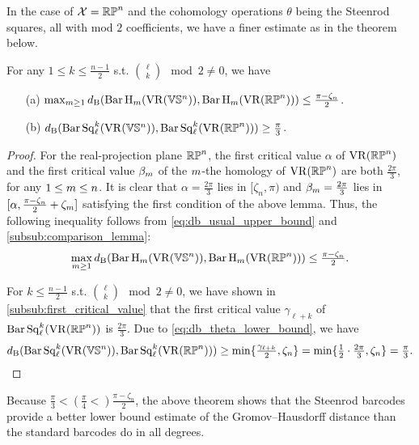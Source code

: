 In the case of $\mathcal{X} = \mathbb{RP}^n$ and the cohomology operations $\theta$ being the Steenrod squares, all with mod $2$ coefficients, we have a finer estimate as in the theorem below.

\medskip\theorem
For any $1\leq k \leq \frac{n-1}{2}$ s.t. $\binom{\ell}{k} \mod 2\neq 0$, we have
\begin{itemize} 
	\item[(a)] $\max_{m\geq 1}d_{\mathrm{B}}(\operatorname{Bar} \operatorname{H}_{m}(\operatorname{VR}(\mathbb{V}\mathbb{S}^n)), \operatorname{Bar} \operatorname{H}_{m}(\operatorname{VR}(\mathbb{RP}^n)))\leq \tfrac{\pi - \zeta_n}{2}$.
	\smallskip\item[(b)] $d_{\mathrm{B}}(\operatorname{Bar}\operatorname{Sq}^{k}_{\ell}(\operatorname{VR}(\mathbb{V}\mathbb{S}^n)), \operatorname{Bar}\operatorname{Sq}^{k}_{\ell}(\operatorname{VR}(\mathbb{RP}^n)))\geq \tfrac{\pi}{3}$.
\end{itemize}

\begin{proof}
        For the real-projection plane $\mathbb{RP}^n$, the first critical value $\alpha$ of $\operatorname{VR}(\mathbb{RP}^n)$ and the first critical value $\beta_m$ of the $m$-the homology of $\operatorname{VR}(\mathbb{RP}^n)$ are both $\tfrac{2\pi}{3}$, for any $1 \leq m \leq n$. %
        It is clear that $\alpha= \tfrac{2\pi}{3}$ lies in $[\zeta_n, \pi)$ and $\beta_m = \tfrac{2\pi}{3}$ lies in $[\alpha, \tfrac{\pi - \zeta_n}{2}+\zeta_m]$ satisfying the first condition of the above lemma. 
        Thus, the following inequality follows from \cref{eq:db_usual_upper_bound} and \cref{subsub:comparison_lemma}:
        \[\max_{m\geq 1}d_{\mathrm{B}}(\operatorname{Bar} \operatorname{H}_{m}(\operatorname{VR}(\mathbb{V}\mathbb{S}^n)), \operatorname{Bar} \operatorname{H}_{m}(\operatorname{VR}(\mathbb{RP}^n)))\leq \tfrac{\pi - \zeta_n}{2}.\]

        For $k \leq \frac{n-1}{2}$ s.t. $\binom{\ell}{k} \mod 2\neq 0$, we have shown in \cref{subsub:first_critical_value} that the first critical value $\gamma_{\ell+k}$ of $\operatorname{Bar}\operatorname{Sq}^{k}_{\ell}(\operatorname{VR}(\mathbb{RP}^n))$ is $\tfrac{2\pi}{3}$. 
        Due to \cref{eq:db_theta_lower_bound}, we have
        \[d_{\mathrm{B}}(\operatorname{Bar}\operatorname{Sq}^{k}_{\ell}(\operatorname{VR}(\mathbb{V}\mathbb{S}^n)), \operatorname{Bar}\operatorname{Sq}^{k}_{\ell}(\operatorname{VR}(\mathbb{RP}^n))) 
        \geq \min\{\tfrac{\gamma_{\ell+k}}{2}, \zeta_n\} 
        = \min\{\tfrac{1}{2}\cdot\tfrac{2\pi}{3}, \zeta_n\} 
        = \tfrac{\pi}{3}.\]
\end{proof}

Because $\tfrac{\pi}{3} < (\tfrac{\pi}{4} <) \tfrac{\pi - \zeta_n}{2}$, the above theorem shows that the Steenrod barcodes provide a better lower bound estimate of the Gromov--Hausdorff distance than the standard barcodes do in all degrees.
